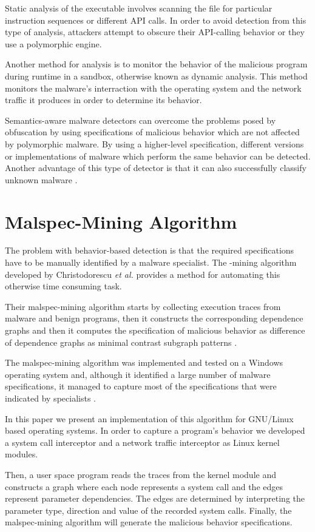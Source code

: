 Static analysis of the executable involves scanning the file for particular instruction sequences or different API calls. In order to avoid detection from this type of analysis, attackers attempt to obscure their API-calling behavior or they use a polymorphic engine.

Another method for analysis is to monitor the behavior of the malicious program during runtime in a sandbox, otherwise known as dynamic analysis. This method monitors the malware's interraction with the operating system and the network traffic it produces in order to determine its behavior.

Semantics-aware malware detectors can overcome the problems posed by obfuscation by using specifications of malicious behavior which are not affected by polymorphic malware. By using a higher-level specification, different versions or implementations of malware which perform the same behavior can be detected. Another advantage of this type of detector is that it can also successfully classify unknown malware \cite{semantics-based-detection}.

\section{Malspec-Mining Algorithm}
\label{sec:malspec-alg}

The problem with behavior-based detection is that the required specifications have to be manually identified by a malware specialist. The -mining algorithm developed by Christodorescu \textit{et al.} \cite{mining-specifications} provides a method for automating this otherwise time consuming task. 

Their malspec-mining algorithm starts by collecting execution traces from malware and benign programs, then it constructs the corresponding dependence graphs and then it computes the specification of malicious behavior as difference of dependence graphs as minimal contrast subgraph patterns \cite{minimal-contrast-subgraph}.

The malspec-mining algorithm was implemented and tested on a Windows operating system and, although it identified a large number of malware specifications, it managed to capture most of the specifications that were indicated by specialists \cite{mining-specifications}.

In this paper we present an implementation of this algorithm for GNU/Linux based operating systems. In order to capture a program’s behavior we developed a system call interceptor and a network traffic interceptor as Linux kernel modules.

Then, a user space program reads the traces from the kernel module and constructs a graph where each node represents a system call and the edges represent parameter dependencies. The edges are determined by interpreting the parameter type, direction and value of the recorded system calls. Finally, the malspec-mining algorithm will generate the malicious behavior specifications.
